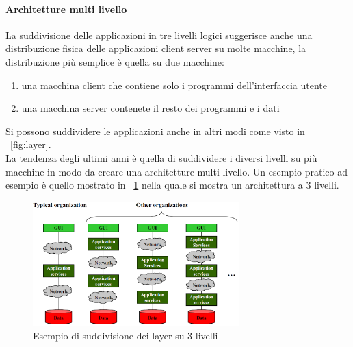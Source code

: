 \paragraph{Architetture multi livello}
La suddivisione delle applicazioni in tre livelli logici suggerisce anche una distribuzione fisica delle applicazioni client server su molte macchine, la distribuzione più semplice è quella su due macchine:
\begin{enumerate}
\item una macchina client che contiene solo i programmi dell'interfaccia utente
\item una macchina server contenete il resto dei programmi e i dati
\end{enumerate}
Si possono suddividere le applicazioni anche in altri modi come visto in \figurename~\ref{fig:layer}.\\
La tendenza degli ultimi anni è quella di suddividere i diversi livelli su più macchine in modo da creare una architetture multi livello.
Un esempio pratico ad esempio è quello mostrato in \figurename~\ref{fig:3layer} nella quale si mostra un architettura a 3 livelli.\\
\begin{figure}[htb]
\centering
\includegraphics[width=8cm]{img/3layer.png}
\caption{Esempio di suddivisione dei layer su 3 livelli}\label{fig:3layer}
\end{figure}
